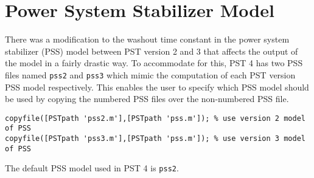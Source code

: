 \section{Power System Stabilizer Model}  
There was a modification to the washout time constant in the power system stabilizer (PSS) model between PST version 2 and 3 that affects the output of the model in a fairly drastic way.
To accommodate for this, PST 4 has two PSS files named \verb|pss2| and \verb|pss3| which mimic the computation of each PST version PSS model respectively.
This enables the user to specify which PSS model should be used by copying the numbered PSS files over the non-numbered PSS file.
\begin{verbatim}
copyfile([PSTpath 'pss2.m'],[PSTpath 'pss.m']); % use version 2 model of PSS
copyfile([PSTpath 'pss3.m'],[PSTpath 'pss.m']); % use version 3 model of PSS
\end{verbatim}
The default PSS model used in PST 4 is \verb|pss2|.

